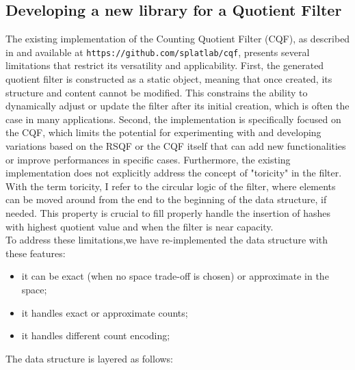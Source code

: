 \subsection{Developing a new library for a Quotient Filter}
The existing implementation of the Counting Quotient Filter (CQF), as described in \cite{cqf} and available at \texttt{https://github.com/splatlab/cqf}, presents several limitations that restrict its versatility and applicability. First, the generated quotient filter is constructed as a static object, meaning that once created, its structure and content cannot be modified. This constrains the ability to dynamically adjust or update the filter after its initial creation, which is often the case in many applications.
Second, the implementation is specifically focused on the CQF, which limits the potential for experimenting with and developing variations based on the RSQF or the CQF itself that can add new functionalities or improve performances in specific cases. Furthermore, the existing implementation does not explicitly address the concept of "toricity" in the filter. With the term toricity, I refer to the circular logic of the filter, where elements can be moved around from the end to the beginning of the data structure, if needed. This property is crucial to fill properly handle the insertion of hashes with highest quotient value and when the filter is near capacity.\\
To address these limitations,we have re-implemented the data structure with these features:
\begin{itemize}
	\item it can be exact (when no space trade-off is chosen) or approximate in the \kmer space;
	\item it handles exact or approximate counts;
	\item it handles different count encoding;
\end{itemize}
The data structure is layered as follows:
